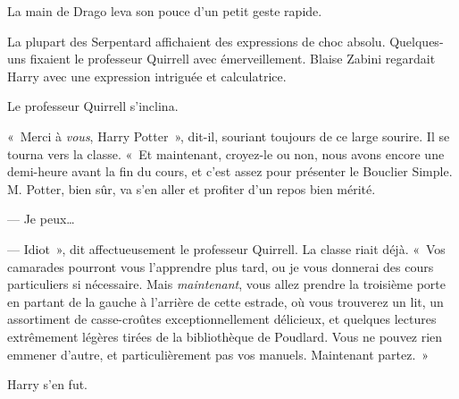 La main de Drago leva son pouce d'un petit geste rapide.

La plupart des Serpentard affichaient des expressions de choc absolu.
Quelques-uns fixaient le professeur Quirrell avec émerveillement.
Blaise Zabini regardait Harry avec une expression intriguée et calculatrice.

Le professeur Quirrell s'inclina.

«~Merci à \emph{vous}, Harry Potter~», dit-il, souriant toujours de ce large sourire.
Il se tourna vers la classe.
«~Et maintenant, croyez-le ou non, nous avons encore une demi-heure avant la fin du cours, et c'est assez pour présenter le Bouclier Simple.
M. Potter, bien sûr, va s'en aller et profiter d'un repos bien mérité.

--- Je peux…

--- Idiot~», dit affectueusement le professeur Quirrell.
La classe riait déjà.
«~Vos camarades pourront vous l'apprendre plus tard, ou je vous donnerai des cours particuliers si nécessaire.
Mais \emph{maintenant}, vous allez prendre la troisième porte en partant de la gauche à l'arrière de cette estrade, où vous trouverez un lit, un assortiment de casse-croûtes exceptionnellement délicieux, et quelques lectures extrêmement légères tirées de la bibliothèque de Poudlard.
Vous ne pouvez rien emmener d'autre, et particulièrement pas vos manuels.
Maintenant partez.~»

Harry s'en fut.
